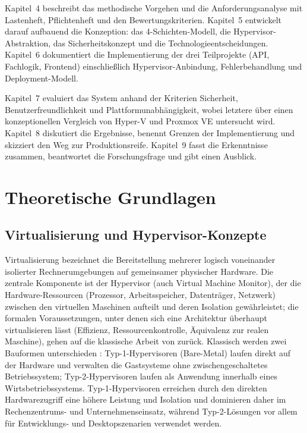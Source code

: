 \documentclass[12pt,a4paper]{article}
\begin{document}
Kapitel~4 beschreibt das methodische Vorgehen und die Anforderungsanalyse mit Lastenheft, Pflichtenheft und den Bewertungskriterien. Kapitel~5 entwickelt darauf aufbauend die Konzeption: das 4-Schichten-Modell, die Hypervisor-Abstraktion, das Sicherheitskonzept und die Technologieentscheidungen. Kapitel~6 dokumentiert die Implementierung der drei Teilprojekte (API, Fachlogik, Frontend) einschließlich Hypervisor-Anbindung, Fehlerbehandlung und Deployment-Modell.

Kapitel~7 evaluiert das System anhand der Kriterien Sicherheit, Benutzerfreundlichkeit und Plattformunabhängigkeit, wobei letztere über einen konzeptionellen Vergleich von Hyper-V und Proxmox VE untersucht wird. Kapitel~8 diskutiert die Ergebnisse, benennt Grenzen der Implementierung und skizziert den Weg zur Produktionsreife. Kapitel~9 fasst die Erkenntnisse zusammen, beantwortet die Forschungsfrage und gibt einen Ausblick.

\newpage
\section{Theoretische Grundlagen}

\subsection{Virtualisierung und Hypervisor-Konzepte}

Virtualisierung bezeichnet die Bereitstellung mehrerer logisch voneinander isolierter Rechnerumgebungen auf gemeinsamer physischer Hardware. Die zentrale Komponente ist der Hypervisor (auch Virtual Machine Monitor), der die Hardware-Ressourcen (Prozessor, Arbeitsspeicher, Datenträger, Netzwerk) zwischen den virtuellen Maschinen aufteilt und deren Isolation gewährleistet; die formalen Voraussetzungen, unter denen sich eine Architektur überhaupt virtualisieren lässt (Effizienz, Ressourcenkontrolle, Äquivalenz zur realen Maschine), gehen auf die klassische Arbeit von \textcite{popekgoldberg1974} zurück. Klassisch werden zwei Bauformen unterschieden \parencite{smithnair2005}: Typ-1-Hypervisoren (Bare-Metal) laufen direkt auf der Hardware und verwalten die Gastsysteme ohne zwischengeschaltetes Betriebssystem; Typ-2-Hypervisoren laufen als Anwendung innerhalb eines Wirtsbetriebssystems. Typ-1-Hypervisoren erreichen durch den direkten Hardwarezugriff eine höhere Leistung und Isolation und dominieren daher im Rechenzentrums- und Unternehmenseinsatz, während Typ-2-Lösungen vor allem für Entwicklungs- und Desktopszenarien verwendet werden.
\end{document}
